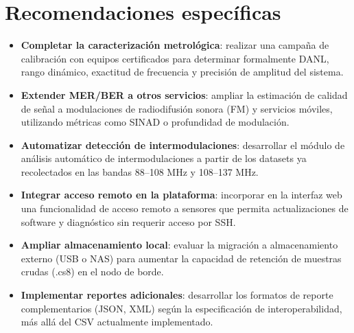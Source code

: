 \section{Recomendaciones específicas}

\begin{itemize}[leftmargin=*]
    \item \textbf{Completar la caracterización metrológica}: realizar una campaña de calibración con equipos certificados para determinar formalmente DANL, rango dinámico, exactitud de frecuencia y precisión de amplitud del sistema.
    \item \textbf{Extender MER/BER a otros servicios}: ampliar la estimación de calidad de señal a modulaciones de radiodifusión sonora (FM) y servicios móviles, utilizando métricas como SINAD o profundidad de modulación.
    \item \textbf{Automatizar detección de intermodulaciones}: desarrollar el módulo de análisis automático de intermodulaciones a partir de los datasets ya recolectados en las bandas 88--108 MHz y 108--137 MHz.
    \item \textbf{Integrar acceso remoto en la plataforma}: incorporar en la interfaz web una funcionalidad de acceso remoto a sensores que permita actualizaciones de software y diagnóstico sin requerir acceso por SSH.
    \item \textbf{Ampliar almacenamiento local}: evaluar la migración a almacenamiento externo (USB o NAS) para aumentar la capacidad de retención de muestras crudas (.cs8) en el nodo de borde.
    \item \textbf{Implementar reportes adicionales}: desarrollar los formatos de reporte complementarios (JSON, XML) según la especificación de interoperabilidad, más allá del CSV actualmente implementado.
\end{itemize}
